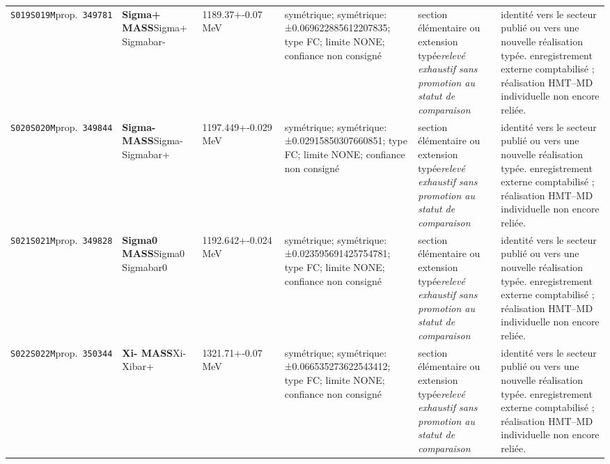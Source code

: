 \begin{landscape}
\begin{longtable}{L{1.85cm}L{4.45cm}L{2.35cm}L{4.05cm}L{3.35cm}L{7.15cm}}
\texttt{S019}\newline \texttt{S019M}\newline prop.\ \texttt{349781} & \textbf{Sigma+ MASS}\newline Sigma+ \textbar{}\allowbreak{} Sigmabar- & 1189.37+-0.07\,MeV & symétrique; symétrique: ±0.069622885612207835; type FC; limite NONE; confiance non consigné & section élémentaire ou extension typée\newline \emph{relevé exhaustif sans promotion au statut de comparaison} & identité vers le secteur publié ou vers une nouvelle réalisation typée. enregistrement externe comptabilisé ; réalisation HMT--MD individuelle non encore reliée. \\
\texttt{S020}\newline \texttt{S020M}\newline prop.\ \texttt{349844} & \textbf{Sigma- MASS}\newline Sigma- \textbar{}\allowbreak{} Sigmabar+ & 1197.449+-0.029\,MeV & symétrique; symétrique: ±0.02915850307660851; type FC; limite NONE; confiance non consigné & section élémentaire ou extension typée\newline \emph{relevé exhaustif sans promotion au statut de comparaison} & identité vers le secteur publié ou vers une nouvelle réalisation typée. enregistrement externe comptabilisé ; réalisation HMT--MD individuelle non encore reliée. \\
\texttt{S021}\newline \texttt{S021M}\newline prop.\ \texttt{349828} & \textbf{Sigma0 MASS}\newline Sigma0 \textbar{}\allowbreak{} Sigmabar0 & 1192.642+-0.024\,MeV & symétrique; symétrique: ±0.023595691425754781; type FC; limite NONE; confiance non consigné & section élémentaire ou extension typée\newline \emph{relevé exhaustif sans promotion au statut de comparaison} & identité vers le secteur publié ou vers une nouvelle réalisation typée. enregistrement externe comptabilisé ; réalisation HMT--MD individuelle non encore reliée. \\
\texttt{S022}\newline \texttt{S022M}\newline prop.\ \texttt{350344} & \textbf{Xi- MASS}\newline Xi- \textbar{}\allowbreak{} Xibar+ & 1321.71+-0.07\,MeV & symétrique; symétrique: ±0.066535273622543412; type FC; limite NONE; confiance non consigné & section élémentaire ou extension typée\newline \emph{relevé exhaustif sans promotion au statut de comparaison} & identité vers le secteur publié ou vers une nouvelle réalisation typée. enregistrement externe comptabilisé ; réalisation HMT--MD individuelle non encore reliée. \\

\end{longtable}
\end{landscape}

